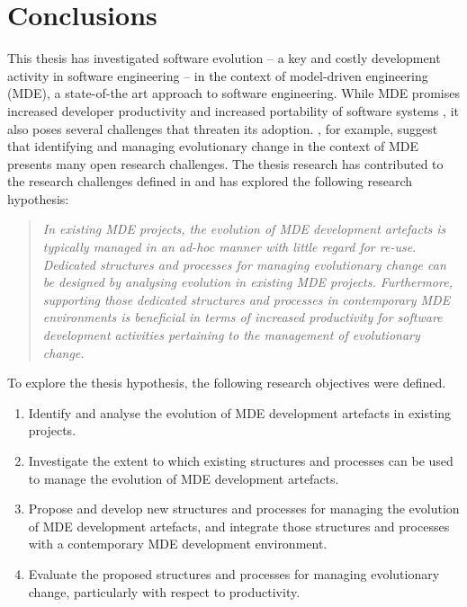 
\chapter{Conclusions}
\label{Conclusion}

This thesis has investigated software evolution -- a key and costly development activity in software engineering \cite{moad90maintaining} -- in the context of model-driven engineering (MDE), a state-of-the art approach to software engineering. While MDE promises increased developer productivity \cite{watson08mdahistory} and increased portability of software systems \cite{frankel02mda}, it also poses several challenges that threaten its adoption. \cite{Mens07}, for example, suggest that identifying and managing evolutionary change in the context of MDE presents many open research challenges. The thesis research has contributed to the research challenges defined in \cite{Mens07} and has explored the following research hypothesis:

\begin{quote}
\emph{In existing MDE projects, the evolution of MDE development artefacts is typically managed in an ad-hoc manner with little regard for re-use. Dedicated structures and processes for managing evolutionary change can be designed by analysing evolution in existing MDE projects. Furthermore, supporting those dedicated structures and processes in contemporary MDE environments is beneficial in terms of increased productivity for software development activities pertaining to the management of evolutionary change.}
\end{quote} 

To explore the thesis hypothesis, the following research objectives were defined.

\begin{enumerate}
	\item Identify and analyse the evolution of MDE development artefacts in existing projects.
	\item Investigate the extent to which existing structures and processes can be used to manage the evolution of MDE development artefacts. 
	\item Propose and develop new structures and processes for managing the evolution of MDE development artefacts, and integrate those structures and processes with a contemporary MDE development environment.
	\item Evaluate the proposed structures and processes for managing evolutionary change, particularly with respect to productivity.
\end{enumerate}

